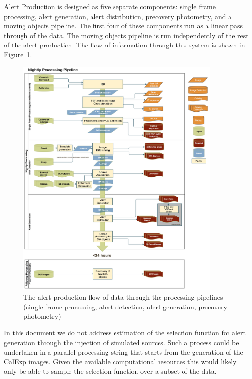 Alert Production is designed as five separate components: single frame processing, alert generation, alert distribution, precovery photometry, and a moving objects pipeline. The first four of these components run as a linear pass through of the data. The moving objects pipeline is run independently of the rest of the alert production. The flow of information through this system is shown in \hyperref[fig:nightly]{Figure~\ref{fig:nightly}}.

\begin{figure}[th]
\begin{center}
\includegraphics[width=0.9\textwidth]{figures/Level_1_Processing_Flowchart.jpg}
\caption{\label{fig:nightly} The alert production flow of data through the processing pipelines (single frame processing, alert detection,  alert generation, precovery photometry) }
\end{center}
\end{figure}

In this document we do not address estimation of the selection function for alert generation through the injection of simulated sources. Such a process could be undertaken in a parallel processing string that starts from the generation of the CalExp images. Given the available computational resources this would likely only be able to sample the selection function over a subset of the data.

